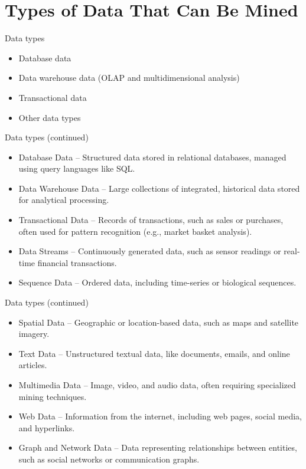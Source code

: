 \documentclass{beamer}
\begin{document}
\section{Types of Data That Can Be Mined}
\begin{frame}{Data types}
    \begin{itemize}
\item Database data

\item Data warehouse data (OLAP and multidimensional analysis)

\item Transactional data 

\item Other data types
    \end{itemize}
\end{frame}

\begin{frame}{Data types (continued)}
    \begin{itemize}
\item Database Data – Structured data stored in relational databases, managed using query languages like SQL.

\item Data Warehouse Data – Large collections of integrated, historical data stored for analytical processing.

\item Transactional Data – Records of transactions, such as sales or purchases, often used for pattern recognition (e.g., market basket analysis).

\item Data Streams – Continuously generated data, such as sensor readings or real-time financial transactions.

\item Sequence Data – Ordered data, including time-series or biological sequences.
    \end{itemize}
\end{frame}

\begin{frame}{Data types (continued)}
    \begin{itemize}
\item Spatial Data – Geographic or location-based data, such as maps and satellite imagery.

\item Text Data – Unstructured textual data, like documents, emails, and online articles.

\item Multimedia Data – Image, video, and audio data, often requiring specialized mining techniques.

\item Web Data – Information from the internet, including web pages, social media, and hyperlinks.

\item Graph and Network Data – Data representing relationships between entities, such as social networks or communication graphs.
    \end{itemize}
\end{frame}
\end{document}
